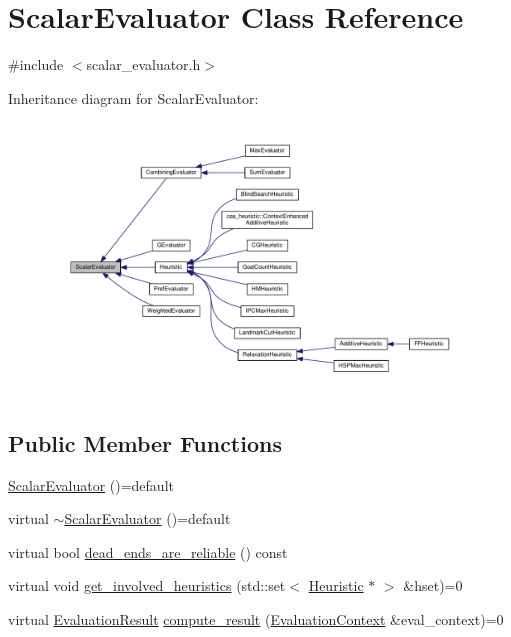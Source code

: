 \hypertarget{classScalarEvaluator}{\section{Scalar\-Evaluator Class Reference}
\label{classScalarEvaluator}
}


{\ttfamily \#include $<$scalar\-\_\-evaluator.\-h$>$}



Inheritance diagram for Scalar\-Evaluator\-:
\nopagebreak
\begin{figure}[H]
\begin{center}
\leavevmode
\includegraphics[width=350pt]{classScalarEvaluator__inherit__graph}
\end{center}
\end{figure}
\subsection*{Public Member Functions}
\begin{DoxyCompactItemize}
\item 
\hyperlink{classScalarEvaluator_ac497109b542bc9f0724f417713530a20}{Scalar\-Evaluator} ()=default
\item 
virtual \hyperlink{classScalarEvaluator_a32d17648c4c69d7f0cfb3461db1a832a}{$\sim$\-Scalar\-Evaluator} ()=default
\item 
virtual bool \hyperlink{classScalarEvaluator_aa4534363976871466aa2be88f82e1a74}{dead\-\_\-ends\-\_\-are\-\_\-reliable} () const 
\item 
virtual void \hyperlink{classScalarEvaluator_a23640092537e3403bbc5b40389f7f253}{get\-\_\-involved\-\_\-heuristics} (std\-::set$<$ \hyperlink{classHeuristic}{Heuristic} $\ast$ $>$ \&hset)=0
\item 
virtual \hyperlink{classEvaluationResult}{Evaluation\-Result} \hyperlink{classScalarEvaluator_a8ffb99b0f8f63e34183a3245a247a9ec}{compute\-\_\-result} (\hyperlink{classEvaluationContext}{Evaluation\-Context} \&eval\-\_\-context)=0
\end{DoxyCompactItemize}


